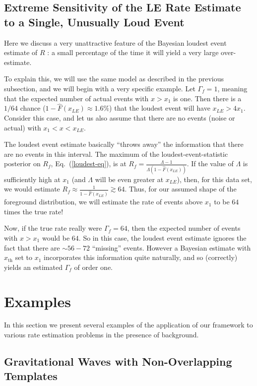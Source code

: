 \documentclass[aps,prd,reprint,nofootinbib]{revtex4-1}
\begin{document}
\subsection{Extreme Sensitivity of the LE Rate Estimate to a Single, Unusually Loud Event}
Here we discuss a very unattractive feature of the Bayesian loudest
event estimate of $R$ \citep{Biswas2009}: a small percentage of the
time it will yield a very large over-estimate.

To explain this, we will use the same model as described in the
previous subsection, and we will begin with a very specific example.
Let $\Gamma_f = 1$, meaning that the expected number of actual events
with $x > x_1$ is one.  Then there is a $1/64$ chance ($1-\hat{F}(x_{LE}) \approx
1.6\%$) that the loudest event will have $x_{LE} > 4 x_1$.  Consider
this case, and let us also assume that there are no events (noise or
actual) with $x_1 < x < x_{LE}$.  

The loudest event estimate basically ``throws away'' the information that there are no events in this interval.  The maximum of the loudest-event-statistic posterior on $R_f$,  Eq.~(\ref{loudest-eq}), is at $R_f = \frac{\Lambda - 1}{ \Lambda (1-\hat{F}(x_{LE}))}$.  If the value of $\Lambda$ is sufficiently high at $x_1$ (and $\Lambda$ will be even greater at $x_{LE}$), then, for this data set, we would estimate $R_f \approx \frac{1}{1-\hat{F}(x_{LE})} \gtrsim 64$.  Thus, for our assumed shape of the foreground distribution, we will estimate the rate of events above $x_1$ to be $64$ times the true rate!  

Now, if the true rate really were $\Gamma_f = 64$, then the expected
number of events with $x > x_1$ would be $64$.  So in this case, the
loudest event estimate ignores the fact that there are $\sim 56 -72$
``missing'' events.  However a Bayesian estimate with $x_\mathrm{th}$
set to $x_1$ incorporates this information quite naturally, and so
(correctly) yields an estimated $\Gamma_f$ of order one.

\section{Examples}
\label{sec:GW-example}

In this section we present several examples of the application of our
framework to various rate estimation problems in the presence of
background.

\subsection{Gravitational Waves with Non-Overlapping Templates}
\label{sec:analytic-GW-example}
\end{document}
